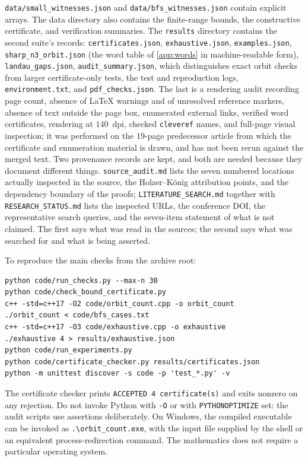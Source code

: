 \documentclass[11pt,a4paper]{article}
\numberwithin{equation}{section}
\theoremstyle{definition}
\theoremstyle{remark}
\begin{document}
\texttt{data/small\_witnesses.json} and
\texttt{data/bfs\_witnesses.json} contain explicit arrays. The data directory
also contains the finite-range bounds, the constructive certificate, and
verification summaries. The \texttt{results} directory contains the second
suite's records: \texttt{certificates.json}, \texttt{exhaustive.json},
\texttt{examples.json}, \texttt{sharp\_n3\_orbit.json} (the word table of
\cref{app:words} in machine-readable form), \texttt{landau\_gaps.json},
\texttt{audit\_summary.json}, which distinguishes exact orbit checks from
larger certificate-only tests, the test and reproduction logs,
\texttt{environment.txt}, and \texttt{pdf\_checks.json}. The last is a
rendering audit recording page count, absence of LaTeX warnings and of
unresolved reference markers, absence of text outside the page box,
enumerated external links, verified word certificates, rendering at
$140$~dpi, checked \texttt{cleveref} names, and full-page visual inspection;
it was performed on the $19$-page predecessor article from which the
certificate and enumeration material is drawn, and has not been rerun against
the merged text. Two provenance records are kept, and both are
needed because they document different things.
\texttt{source\_audit.md} lists the seven numbered locations actually
inspected in the source, the Holzer--K\"onig attribution points, and the
dependency boundary of the proofs; \texttt{LITERATURE\_SEARCH.md} together
with \texttt{RESEARCH\_STATUS.md} lists the inspected URLs, the conference
DOI, the representative search queries, and the seven-item statement of what
is not claimed. The first says what was read in the sources; the second says
what was searched for and what is being asserted.

To reproduce the main checks from the archive root:
\begin{lstlisting}
python code/run_checks.py --max-n 30
python code/check_bound_certificate.py
c++ -std=c++17 -O2 code/orbit_count.cpp -o orbit_count
./orbit_count < code/bfs_cases.txt
c++ -std=c++17 -O3 code/exhaustive.cpp -o exhaustive
./exhaustive 4 > results/exhaustive.json
python code/run_experiments.py
python code/certificate_checker.py results/certificates.json
python -m unittest discover -s code -p 'test_*.py' -v
\end{lstlisting}
The certificate checker prints \texttt{ACCEPTED 4 certificate(s)} and exits
nonzero on any rejection. Do not invoke Python with \texttt{-O} or with
\texttt{PYTHONOPTIMIZE} set: the audit scripts use assertions deliberately.
On Windows, the compiled executable can be invoked as
\texttt{.\textbackslash orbit\_count.exe}, with the input file supplied by the
shell or an equivalent process-redirection command. The mathematics does not
require a particular operating system.
\end{document}
